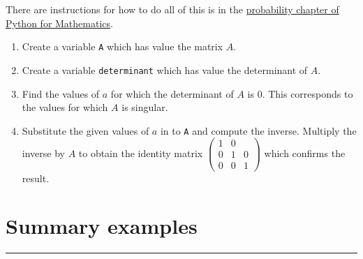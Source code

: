 \documentclass{article}
\begin{document}
There are instructions for how to do all of this is in the
\href{https://vknight.org/pfm/tools-for-mathematics/04-matrices/how/main.html}{probability chapter of Python for Mathematics}.


\begin{enumerate}
    \item Create a variable \texttt{A} which has value the
        matrix \(A\).
    \item Create a variable \texttt{determinant} which has value the 
        determinant of \(A\).
    \item Find the values of $a$ for which the determinant of \(A\) is 0. This
        corresponds to the values for which \(A\) is singular.
    \item Substitute the given values of $a$ in to \texttt{A} and
        compute the inverse. Multiply the inverse by \(A\) to obtain the
        identity matrix $\begin{pmatrix}1 & 0 & \\ 0 & 1 & 0\\ 0 & 0 & 1\end{pmatrix}$
        which confirms the result.
\end{enumerate}

\section{Summary examples}
\hrule
\end{document}
